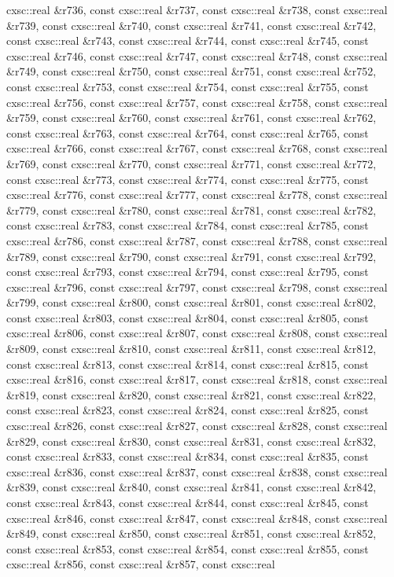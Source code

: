 \begin{DoxyCompactItemize}
cxsc\-::real \&r736, const cxsc\-::real \&r737, const cxsc\-::real \&r738, const cxsc\-::real \&r739, const cxsc\-::real \&r740, const cxsc\-::real \&r741, const cxsc\-::real \&r742, const cxsc\-::real \&r743, const cxsc\-::real \&r744, const cxsc\-::real \&r745, const cxsc\-::real \&r746, const cxsc\-::real \&r747, const cxsc\-::real \&r748, const cxsc\-::real \&r749, const cxsc\-::real \&r750, const cxsc\-::real \&r751, const cxsc\-::real \&r752, const cxsc\-::real \&r753, const cxsc\-::real \&r754, const cxsc\-::real \&r755, const cxsc\-::real \&r756, const cxsc\-::real \&r757, const cxsc\-::real \&r758, const cxsc\-::real \&r759, const cxsc\-::real \&r760, const cxsc\-::real \&r761, const cxsc\-::real \&r762, const cxsc\-::real \&r763, const cxsc\-::real \&r764, const cxsc\-::real \&r765, const cxsc\-::real \&r766, const cxsc\-::real \&r767, const cxsc\-::real \&r768, const cxsc\-::real \&r769, const cxsc\-::real \&r770, const cxsc\-::real \&r771, const cxsc\-::real \&r772, const cxsc\-::real \&r773, const cxsc\-::real \&r774, const cxsc\-::real \&r775, const cxsc\-::real \&r776, const cxsc\-::real \&r777, const cxsc\-::real \&r778, const cxsc\-::real \&r779, const cxsc\-::real \&r780, const cxsc\-::real \&r781, const cxsc\-::real \&r782, const cxsc\-::real \&r783, const cxsc\-::real \&r784, const cxsc\-::real \&r785, const cxsc\-::real \&r786, const cxsc\-::real \&r787, const cxsc\-::real \&r788, const cxsc\-::real \&r789, const cxsc\-::real \&r790, const cxsc\-::real \&r791, const cxsc\-::real \&r792, const cxsc\-::real \&r793, const cxsc\-::real \&r794, const cxsc\-::real \&r795, const cxsc\-::real \&r796, const cxsc\-::real \&r797, const cxsc\-::real \&r798, const cxsc\-::real \&r799, const cxsc\-::real \&r800, const cxsc\-::real \&r801, const cxsc\-::real \&r802, const cxsc\-::real \&r803, const cxsc\-::real \&r804, const cxsc\-::real \&r805, const cxsc\-::real \&r806, const cxsc\-::real \&r807, const cxsc\-::real \&r808, const cxsc\-::real \&r809, const cxsc\-::real \&r810, const cxsc\-::real \&r811, const cxsc\-::real \&r812, const cxsc\-::real \&r813, const cxsc\-::real \&r814, const cxsc\-::real \&r815, const cxsc\-::real \&r816, const cxsc\-::real \&r817, const cxsc\-::real \&r818, const cxsc\-::real \&r819, const cxsc\-::real \&r820, const cxsc\-::real \&r821, const cxsc\-::real \&r822, const cxsc\-::real \&r823, const cxsc\-::real \&r824, const cxsc\-::real \&r825, const cxsc\-::real \&r826, const cxsc\-::real \&r827, const cxsc\-::real \&r828, const cxsc\-::real \&r829, const cxsc\-::real \&r830, const cxsc\-::real \&r831, const cxsc\-::real \&r832, const cxsc\-::real \&r833, const cxsc\-::real \&r834, const cxsc\-::real \&r835, const cxsc\-::real \&r836, const cxsc\-::real \&r837, const cxsc\-::real \&r838, const cxsc\-::real \&r839, const cxsc\-::real \&r840, const cxsc\-::real \&r841, const cxsc\-::real \&r842, const cxsc\-::real \&r843, const cxsc\-::real \&r844, const cxsc\-::real \&r845, const cxsc\-::real \&r846, const cxsc\-::real \&r847, const cxsc\-::real \&r848, const cxsc\-::real \&r849, const cxsc\-::real \&r850, const cxsc\-::real \&r851, const cxsc\-::real \&r852, const cxsc\-::real \&r853, const cxsc\-::real \&r854, const cxsc\-::real \&r855, const cxsc\-::real \&r856, const cxsc\-::real \&r857, const cxsc\-::real 
\end{DoxyCompactItemize}
